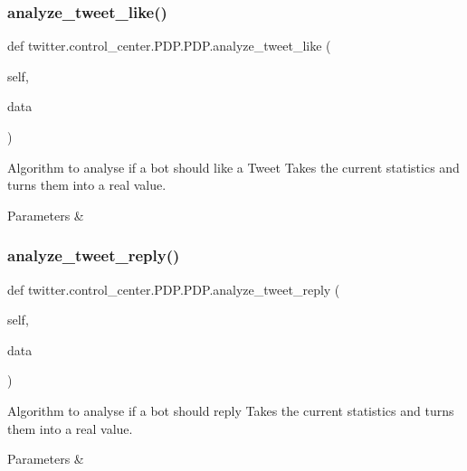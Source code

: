 \subsubsection{\texorpdfstring{analyze\+\_\+tweet\+\_\+like()}{analyze\_tweet\_like()}}
{\footnotesize\ttfamily def twitter.\+control\+\_\+center.\+P\+D\+P.\+P\+D\+P.\+analyze\+\_\+tweet\+\_\+like (\begin{DoxyParamCaption}\item[{}]{self,  }\item[{}]{data }\end{DoxyParamCaption})}



Algorithm to analyse if a bot should like a Tweet Takes the current statistics and turns them into a real value. 


\begin{DoxyParams}{Parameters}
{\em } & \\
\hline
\end{DoxyParams}
\mbox{\label{classtwitter_1_1control__center_1_1PDP_1_1PDP_acbac2033b2853b89b3ee19ed040586e8}} 
\subsubsection{\texorpdfstring{analyze\+\_\+tweet\+\_\+reply()}{analyze\_tweet\_reply()}}
{\footnotesize\ttfamily def twitter.\+control\+\_\+center.\+P\+D\+P.\+P\+D\+P.\+analyze\+\_\+tweet\+\_\+reply (\begin{DoxyParamCaption}\item[{}]{self,  }\item[{}]{data }\end{DoxyParamCaption})}



Algorithm to analyse if a bot should reply Takes the current statistics and turns them into a real value. 


\begin{DoxyParams}{Parameters}
{\em } & \\
\hline
\end{DoxyParams}
\mbox{\label{classtwitter_1_1control__center_1_1PDP_1_1PDP_ae173efc2c97b103ad0fbb0484c27835a}} 
